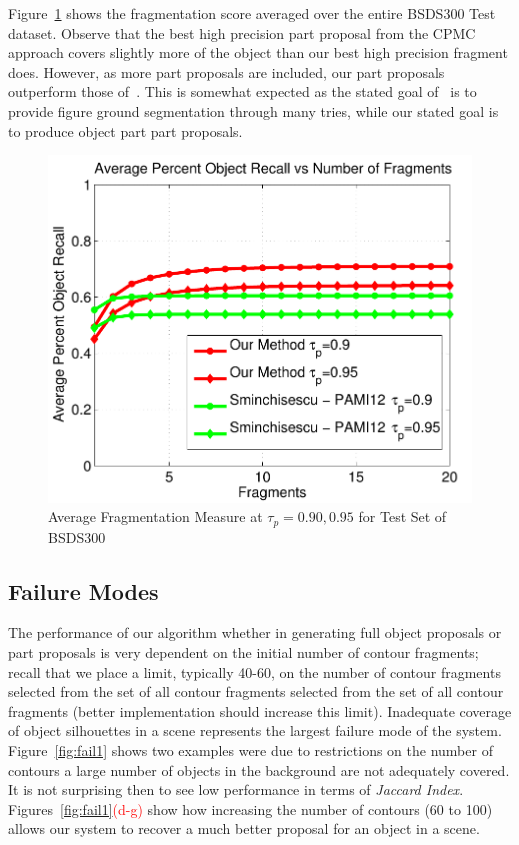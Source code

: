 
Figure~\ref{fig:cpmc_vs_ours1} shows the fragmentation score averaged over the entire BSDS300 Test dataset. Observe that the best high precision part proposal from the CPMC~\cite{Carreira:Sminchisescu:PAMI12} approach covers slightly more of the object than our best high precision fragment does. However, as more part proposals are included, our part proposals outperform those of~\cite{Carreira:Sminchisescu:PAMI12}. This is somewhat expected as the stated goal of~\cite{Carreira:Sminchisescu:PAMI12} is to provide figure ground segmentation through many tries, while our stated goal is to produce object part part proposals.

\begin{figure}[h!]
  \centering
  \includegraphics[width=0.3\linewidth]{figs/03_12_12_fragmentation_score_full_bsdtest.pdf}  
  \caption{Average Fragmentation Measure at $\tau_p=0.90,0.95$ for Test Set of BSDS300}
  \label{fig:cpmc_vs_ours1}

\end{figure}



\subsection{Failure Modes}

The performance of our algorithm whether in generating full object proposals or part proposals is very dependent on the initial number of contour fragments; recall that we place a limit, typically 40-60, on the number of contour fragments selected from the set of all contour fragments selected from the set of all contour fragments (better implementation should increase this limit). Inadequate coverage of object silhouettes in a scene represents the largest failure mode of the system. Figure~\ref{fig:fail1} shows two examples were due to restrictions on the number of contours a large number of objects in the background are not adequately covered. It is not surprising then to see low performance in terms of \emph{Jaccard Index}. Figures~\ref{fig:fail1}\textcolor{red}{(d-g)} show how increasing the number of contours (60 to 100) allows our system to recover a much better proposal for an object in a scene. 


